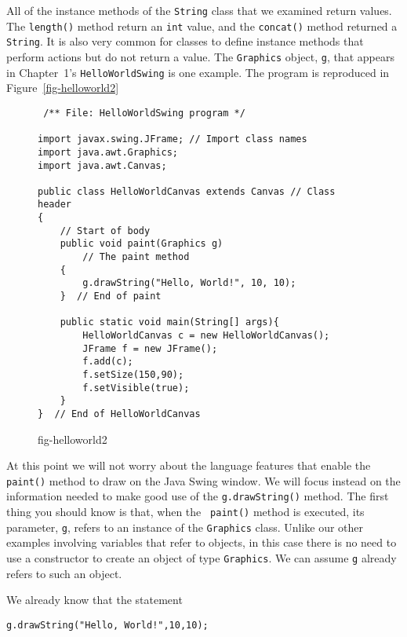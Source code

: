 All of the instance methods of the {\tt String} class that we examined
return values. The {\tt length()} method return an {\tt int} value,
and the {\tt concat()} method returned a {\tt String}.  It is also
very common for classes to define instance methods that perform
actions but do not return a value. The {\tt Graphics} object, {\tt g},
that appears in Chapter~1's {\tt HelloWorldSwing} is one
example. The program is reproduced in Figure~\ref{fig-helloworld2}
\begin{figure}[h!]
\jjjprogstart
\begin{jjjlisting}
\begin{lstlisting}
 /** File: HelloWorldSwing program */

import javax.swing.JFrame; // Import class names
import java.awt.Graphics;
import java.awt.Canvas;

public class HelloWorldCanvas extends Canvas // Class header
{                                            
    // Start of body
    public void paint(Graphics g)           
        // The paint method
    {
        g.drawString("Hello, World!", 10, 10);
    }  // End of paint

    public static void main(String[] args){
        HelloWorldCanvas c = new HelloWorldCanvas();
        JFrame f = new JFrame();
        f.add(c);
        f.setSize(150,90);
        f.setVisible(true);
    }
}  // End of HelloWorldCanvas

\end{lstlisting}
\end{jjjlisting}
{fig-helloworld2}
\end{figure}

At this point we will not worry about the language features that
enable the {\tt paint()} method to draw on the Java Swing window.  
We will focus instead on the
information needed to make good use of the {\tt g.drawString()}
method.  The first thing you should know is that, when the {\tt
paint()} method is executed, its parameter, {\tt g}, refers to an
instance of the {\tt Graphics} class. Unlike our other examples
involving variables that refer to objects, in this case there is no need to use a
constructor to create an object of type {\tt Graphics}. We can assume
{\tt g} already refers to such an object.

We already know that the statement

\begin{jjjlisting}
\begin{lstlisting} 
g.drawString("Hello, World!",10,10);   
\end{lstlisting}
\end{jjjlisting}


